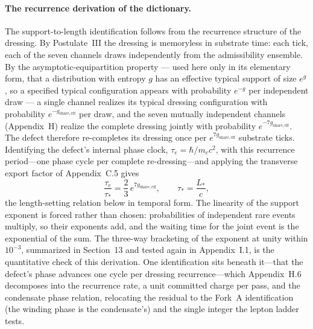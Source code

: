 \documentclass[11pt]{article}
\begin{document}
\paragraph{The recurrence derivation of the dictionary.}
The support-to-length identification follows from the recurrence structure of the dressing. By Postulate~III the dressing is memoryless in substrate time: each tick, each of the seven channels draws independently from the admissibility ensemble. By the asymptotic-equipartition property --- used here only in its elementary form, that a distribution with entropy $g$ has an effective typical support of size $e^{g}$, so a specified typical configuration appears with probability $e^{-g}$ per independent draw --- a single channel realizes its typical dressing configuration with probability $e^{-g_{\mathrm{share,eff}}}$ per draw, and the seven mutually independent channels (Appendix~H) realize the complete dressing jointly with probability $e^{-7g_{\mathrm{share,eff}}}$. The defect therefore re-completes its dressing once per $e^{7g_{\mathrm{share,eff}}}$ substrate ticks. Identifying the defect's internal phase clock, $\tau_e=\hbar/m_ec^2$, with this recurrence period---one phase cycle per complete re-dressing---and applying the transverse export factor of Appendix~C.5 gives
\[
\frac{\tau_e}{\tau_*}=\frac{2}{3}\,e^{7g_{\mathrm{share,eff}}},\qquad \tau_*=\frac{L_*}{c},
\]
the length-setting relation below in temporal form. The linearity of the support exponent is forced rather than chosen: probabilities of independent rare events multiply, so their exponents add, and the waiting time for the joint event is the exponential of the sum. The three-way bracketing of the exponent at unity within $10^{-3}$, summarized in Section~13 and tested again in Appendix~I.1, is the quantitative check of this derivation. One identification sits beneath it---that the defect's phase advances one cycle per dressing recurrence---which Appendix~H.6 decomposes into the recurrence rate, a unit committed charge per pass, and the condensate phase relation, relocating the residual to the Fork~A identification (the winding phase is the condensate's) and the single integer the lepton ladder tests.
\end{document}
